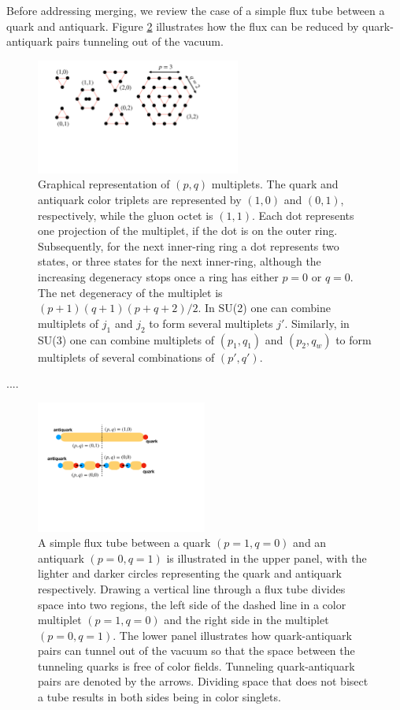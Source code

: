 \documentclass[aps, prc, 12pt, nofootinbib, showpacs, superscriptaddress, tightenlines, groupedaddress]{revtex4-2}
\begin{document}
Before addressing merging, we review the case of a simple flux tube between a quark and antiquark. Figure \ref{fig:simpletube} illustrates how the flux can be reduced by quark-antiquark pairs tunneling out of the vacuum. 
\begin{figure}
\centerline{\includegraphics[width=0.6\textwidth]{figs/pqmultiplet.pdf}}
\caption{\label{fig:pqmultiplet}
Graphical representation of $(p,q)$ multiplets. The quark and antiquark color{} triplets are represented by $(1,0)$ and $(0,1)$, respectively, while the gluon octet is $(1,1)$. Each dot represents one projection of the multiplet, if the dot is on the outer ring. Subsequently, for the next inner-ring ring a dot represents two states, or three states for the next inner-ring, although the increasing degeneracy stops once a ring has either $p=0$ or $q=0$. The net degeneracy of the multiplet is $(p+1)(q+1)(p+q+2)/2$. In SU(2) one can combine multiplets of $j_1$ and $j_2$ to form several multiplets $j'$. Similarly, in SU(3) one can combine multiplets of $(p_1,q_1)$ and $(p_2,q_w)$ to form multiplets of several combinations of $(p',q')$.
}
\end{figure}

....

\begin{figure}
\centerline{\includegraphics[width=0.5\textwidth]{figs/simpletube.pdf}}
\caption{\label{fig:simpletube}
A simple flux tube between a quark $(p=1,q=0)$ and an antiquark $(p=0,q=1)$ is illustrated in the upper panel, with the lighter and darker circles representing the quark and antiquark respectively. Drawing a vertical line through a flux tube divides space into two regions, the left side of the dashed line in a color multiplet $(p=1,q=0)$ and the right side in the multiplet $(p=0,q=1)$. The lower panel illustrates how quark-antiquark pairs can tunnel out of the vacuum so that the space between the tunneling quarks is free of color fields. Tunneling quark-antiquark pairs are denoted by the arrows.  Dividing space that does not bisect a tube results in both sides being in color singlets.
}
\end{figure}
\end{document}
